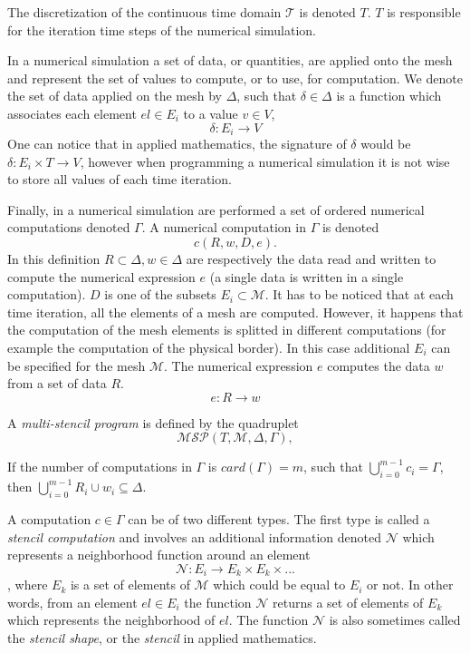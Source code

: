 The discretization of the continuous time domain $\mathcal{T}$ is denoted $T$. $T$ is responsible for the iteration time steps of the numerical simulation. 

In a numerical simulation a set of data, or quantities, are applied onto the mesh and represent the set of values to compute, or to use, for computation. We denote the set of data applied on the mesh by $\Delta$, such that $\delta \in \Delta$ is a function which associates each element $el \in E_i$ to a value $v \in V$, 
\begin{equation*}
\delta : E_i \rightarrow V
\end{equation*}
One can notice that in applied mathematics, the signature of $\delta$ would be $\delta : E_i \times T \rightarrow V$, however when programming a numerical simulation it is not wise to store all values of each time iteration.

Finally, in a numerical simulation are performed a set of ordered numerical computations denoted $\Gamma$. A numerical computation in $\Gamma$ is denoted 
\begin{equation*}
c(R,w,D,e). 
\end{equation*}
In this definition $R \subset \Delta, w \in \Delta$ are respectively the data read and written to compute the numerical expression $e$ (a single data is written in a single computation). $D$ is one of the subsets $E_i \subset \mathcal{M}$. It has to be noticed that at each time iteration, all the elements of a mesh are computed. However, it happens that the computation of the mesh elements is splitted in different computations (for example the computation of the physical border). In this case additional $E_i$ can be specified for the mesh $\mathcal{M}$.
The numerical expression $e$ computes the data $w$ from a set of data $R$.
\begin{equation*}
e : R \rightarrow w
\end{equation*}

A \textit{multi-stencil program} is defined by the quadruplet
\begin{equation}
\mathcal{MSP}(T,\mathcal{M},\Delta,\Gamma),
\end{equation}

If the number of computations in $\Gamma$ is $card(\Gamma)=m$, such that $\bigcup_{i=0}^{m-1}c_i = \Gamma$, then $\bigcup_{i=0}^{m-1}R_i \cup w_i \subseteq \Delta$.

A computation $c \in \Gamma$ can be of two different types. The first type is called a \textit{stencil computation} and involves an additional information denoted $\mathcal{N}$ which represents a neighborhood function around an element
\begin{equation}
\mathcal{N} : E_i \rightarrow E_k \times E_k \times ...
\end{equation}
, where $E_k$ is a set of elements of $\mathcal{M}$ which could be equal to $E_i$ or not. In other words, from an element $el \in E_i$ the function $\mathcal{N}$ returns a set of elements of $E_k$ which represents the neighborhood of $el$. The function $\mathcal{N}$ is also sometimes called the \textit{stencil shape}, or the \textit{stencil} in applied mathematics.

